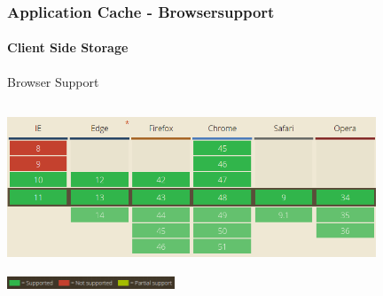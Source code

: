 \begin{frame}[fragile]
\frametitle{Application Cache - Browsersupport}
\framesubtitle{Client Side Storage}
	Browser Support
	\begin{center}
		\includegraphics[height=5cm,width=11cm]{img/appCache-support.png}
		\\
		\includegraphics[height=0.5cm,width=5cm]{img/legende.png}
	\end{center}
\end{frame}